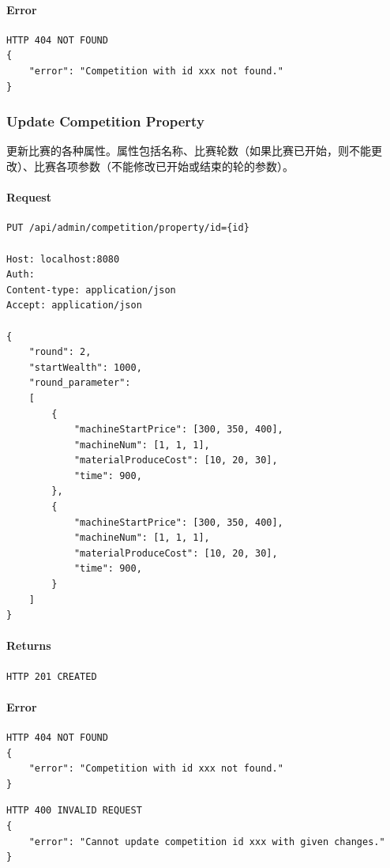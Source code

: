 \documentclass{article}
\begin{document}
\paragraph*{Error}
\begin{lstlisting}
HTTP 404 NOT FOUND
{
    "error": "Competition with id xxx not found."
}
\end{lstlisting}

\subsubsection{Update Competition Property}

更新比赛的各种属性。属性包括名称、比赛轮数（如果比赛已开始，则不能更改）、比赛各项参数（不能修改已开始或结束的轮的参数）。

\paragraph*{Request}
\begin{lstlisting}
PUT /api/admin/competition/property/id={id}

Host: localhost:8080
Auth:
Content-type: application/json
Accept: application/json

{
    "round": 2,
    "startWealth": 1000,
    "round_parameter":
    [
        {
            "machineStartPrice": [300, 350, 400],
            "machineNum": [1, 1, 1],
            "materialProduceCost": [10, 20, 30],
            "time": 900,
        },
        {
            "machineStartPrice": [300, 350, 400],
            "machineNum": [1, 1, 1],
            "materialProduceCost": [10, 20, 30],
            "time": 900,
        }
    ]
}
\end{lstlisting}

\paragraph*{Returns}
\begin{lstlisting}
HTTP 201 CREATED
\end{lstlisting}

\paragraph*{Error}
\begin{lstlisting}
HTTP 404 NOT FOUND
{
    "error": "Competition with id xxx not found."
}
\end{lstlisting}

\begin{lstlisting}
HTTP 400 INVALID REQUEST
{
    "error": "Cannot update competition id xxx with given changes."
}
\end{lstlisting}
\end{document}
